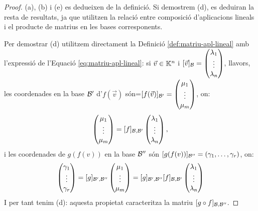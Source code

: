 \documentclass[
  11pt,
]{book}
\numberwithin{dummy}{section}
\theoremstyle{maincolornumbox}
\theoremstyle{blacknumex}
\theoremstyle{blacknumbox}
\theoremstyle{maincolornum}
\newlength\esp
\begin{document}
\begin{proof}
(a), (b) i (e) es dedueixen de la definició. Si demostrem (d),
es deduiran la resta de resultats, ja que utilitzen la relació entre
composició d'aplicacions lineals i el producte de matrius en les bases
corresponents.

Per demostrar (d) utilitzem directament la Definició
\ref{def:matriu-apl-lineal} amb l'expressió de l'Equació
\eqref{eq:matriu-apl-lineal}: si \(\vec v\in \mathbb{K}^n\) i
\([\vec v]_{\mathcal{B}}=\begin{pmatrix}\lambda_1\\\vdots\\\lambda_n\end{pmatrix}\),
llavors, les coordenades en la base \(\mathcal{B}'\) d'\(f(\vec v)\)
són=\([f(\vec v)]_{\mathcal{B}'} = \begin{pmatrix}\mu_1\\\vdots\\\mu_m\end{pmatrix}\),
on:
\[\begin{pmatrix}\mu_1\\ \vdots \\ \mu_m \end{pmatrix}=[f]_{\mathcal{B},\mathcal{B}'}\begin{pmatrix}\lambda_1 \\ \vdots \\ \lambda_n \end{pmatrix},\]
i les coordenades de \(g(f(v))\) en la base \(\mathcal{B}''\) són
\([g(f(v))]_{\mathcal{B}''}=(\gamma_1,\dots,\gamma_r)\), on:
\[\begin{pmatrix}\gamma_1\\ \vdots \\ \gamma_r \end{pmatrix}=[g]_{\mathcal{B}',\mathcal{B}''}\begin{pmatrix}\mu_1 \\ \vdots \\ \mu_m \end{pmatrix}=
    [g]_{\mathcal{B}',\mathcal{B}''} [f]_{\mathcal{B},\mathcal{B}'}\begin{pmatrix}\lambda_1 \\ \vdots \\ \lambda_n \end{pmatrix}\]
I per tant tenim (d): aquesta propietat caracteritza la matriu
\([g\circ f]_{\mathcal{B},\mathcal{B}''}\).
\end{proof}
\end{document}
